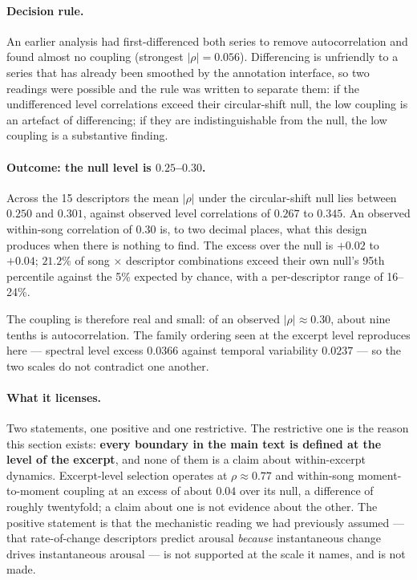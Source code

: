 \paragraph{Decision rule.}
An earlier analysis had first-differenced both series to remove autocorrelation and
found almost no coupling (strongest $|\rho| = 0.056$). Differencing is unfriendly to a
series that has already been smoothed by the annotation interface, so two readings
were possible and the rule was written to separate them: if the undifferenced level
correlations exceed their circular-shift null, the low coupling is an artefact of
differencing; if they are indistinguishable from the null, the low coupling is a
substantive finding.

\paragraph{Outcome: the null level is $0.25$--$0.30$.}
Across the 15 descriptors the mean $|\rho|$ under the circular-shift null lies between
$0.250$ and $0.301$, against observed level correlations of $0.267$ to $0.345$. An
observed within-song correlation of $0.30$ is, to two decimal places, what this design
produces when there is nothing to find. The excess over the null is $+0.02$ to
$+0.04$; $21.2\%$ of song $\times$ descriptor combinations exceed their own null's
95th percentile against the 5\% expected by chance, with a per-descriptor range of
16--24\%.

The coupling is therefore real and small: of an observed $|\rho| \approx 0.30$, about
nine tenths is autocorrelation. The family ordering seen at the excerpt level
reproduces here --- spectral level excess $0.0366$ against temporal variability
$0.0237$ --- so the two scales do not contradict one another.

\paragraph{What it licenses.}
Two statements, one positive and one restrictive. The restrictive one is the reason
this section exists: \textbf{every boundary in the main text is defined at the level of
the excerpt}, and none of them is a claim about within-excerpt dynamics. Excerpt-level
selection operates at $\rho \approx 0.77$ and within-song moment-to-moment coupling at
an excess of about $0.04$ over its null, a difference of roughly twentyfold; a claim
about one is not evidence about the other. The positive statement is that the
mechanistic reading we had previously assumed --- that rate-of-change descriptors
predict arousal \emph{because} instantaneous change drives instantaneous arousal --- is
not supported at the scale it names, and is not made.

